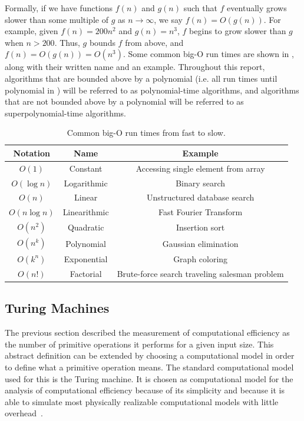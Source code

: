 Formally, if we have functions $f(n)$ and $g(n)$ such that $f$ eventually grows slower than some multiple of $g$ as $n \to \infty$, we say $f(n) = O(g(n))$.
For example, given $f(n) = 200n^2$ and $g(n) = n^3$, $f$ begins to grow slower than $g$ when $n > 200$.
Thus, $g$ bounds $f$ from above, and $f(n) = O(g(n)) = O(n^3)$.
Some common big-O run times are shown in , along with their written name and an example.
Throughout this report, algorithms that are bounded above by a polynomial (i.e. all run times until polynomial in ) will be referred to as polynomial-time algorithms, and algorithms that are not bounded above by a polynomial will be referred to as superpolynomial-time algorithms.

\begin{table}[ht]
    \centering
    {\renewcommand{\arraystretch}{1.1}
        \begin{tabular}{ c|c|c }
            Notation & Name & Example \\
            \hline
            $O(1)$ & Constant & Accessing single element from array \\
            $O(\log n)$ & Logarithmic & Binary search \\
            $O(n)$ & Linear & Unstructured database search \\
            $O(n \log n)$ & Linearithmic & Fast Fourier Transform \\
            $O(n^2)$ & Quadratic & Insertion sort \\
            $O(n^k)$ & Polynomial & Gaussian elimination \\
            $O(k^n)$ & Exponential & Graph coloring \\
            $O(n!)$ & Factorial & Brute-force search traveling salesman problem \\
        \end{tabular}
    }
    \caption{Common big-O run times from fast to slow.}
    \label{table:common-big-o}
\end{table}

\subsection{Turing Machines}
The previous section described the measurement of computational efficiency as the number of primitive operations it performs for a given input size.
This abstract definition can be extended by choosing a computational model in order to define what a primitive operation means.
The standard computational model used for this is the Turing machine.
It is chosen as computational model for the analysis of computational efficiency because of its simplicity and because it is able to simulate most physically realizable computational models with little overhead~\cite{arora2009computational}.

